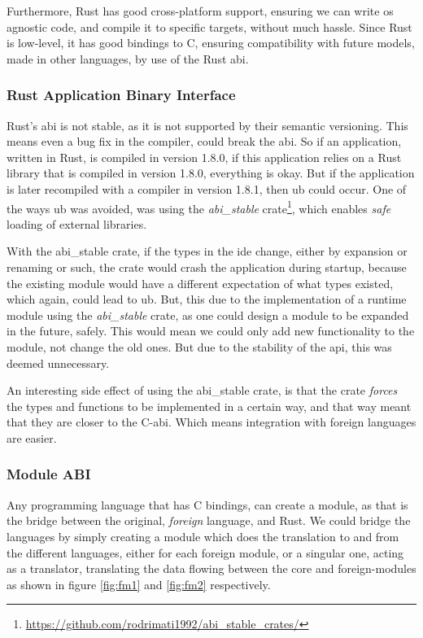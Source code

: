 Furthermore, Rust has good cross-platform support, ensuring
we can write \gls*{os} agnostic code, and compile it to specific targets,
without much hassle. Since Rust is low-level, it has good bindings to C,
ensuring compatibility with future models, made in other languages, by use of
the Rust \gls*{abi}.

\subsubsection{Rust Application Binary Interface}

Rust's \gls*{abi} is not stable, as it is not supported by their semantic
versioning. This means even a bug fix in the compiler, could break the
\gls*{abi}. So if an application, written in Rust, is compiled in version 1.8.0,
if this application relies on a Rust library that is compiled in version 1.8.0,
everything is okay. But if the application is later recompiled with a compiler
in version 1.8.1, then \gls*{ub} could occur. One of the ways \gls*{ub} was
avoided, was using the \textit{abi\_stable} crate\footnote{\url{https://github.com/rodrimati1992/abi\_stable\_crates/}},
which enables \textit{safe} loading of external libraries.

With the abi\_stable crate, if the types in the \gls*{ide} change, either by
expansion or renaming or such, the crate would crash the application during
startup, because the existing module would have a different expectation of what
types existed, which again, could lead to \gls*{ub}. But, this due to the
implementation of a runtime module using the \textit{abi\_stable} crate, as one
could design a module to be expanded in the future, safely. This would mean we
could only add new functionality to the module, not change the old ones. But due
to the stability of the \gls*{api}, this was deemed unnecessary.

An interesting side effect of using the abi\_stable crate, is that the crate
\textit{forces} the types and functions to be implemented in a certain way, and
that way meant that they are closer to the C-\gls*{abi}. Which means integration
with foreign languages are easier.


\subsubsection{Module ABI}

Any programming language that has C bindings, can create a module, as that is
the bridge between the original, \textit{foreign} language, and Rust. We could
bridge the languages by simply creating a module which does the translation to
and from the different languages, either for each foreign module, or a singular
one, acting as a translator, translating the data flowing between the core and
foreign-modules as shown in figure \ref{fig:fm1} and \ref{fig:fm2} respectively.


